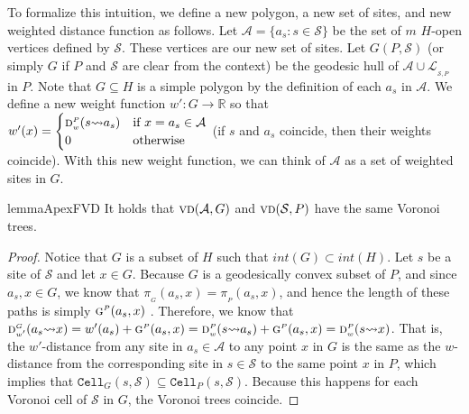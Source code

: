 \documentclass[a4paper, 11pt]{article}
\newcommand{\s}{\mathcal S}
\newcommand{\g}[3][P]{\ensuremath{\textsc{g}^{\scriptscriptstyle #1}(#2, #3)}}
\newcommand{\dd}[3][P]{\ensuremath{\textsc{d}_{\scriptscriptstyle w}^{\scriptscriptstyle #1}(#2 {\leadsto} #3)}}
\newcommand{\ddw}[3][P]{\ensuremath{\textsc{d}_{\scriptscriptstyle w'}^{\scriptscriptstyle #1}(#2 {\leadsto} #3)}}
\newcommand{\p}[3][P]{\ensuremath{\pi_{_{#1}}(#2, #3)}}
\newcommand{\cell}[2][P]{\ensuremath{\mathtt{Cell}_{\scriptscriptstyle #1}(#2)}}
\newcommand{\vd}[2][P]{\textsc{vd}(#2, #1)}
\newcommand{\LL}[1][\s, P]{\ensuremath{\mathcal L_{_{#1}}}}
\newcommand{\A}{\ensuremath{\mathcal A}}
\begin{document}
To formalize this intuition, we define a new polygon, a new set of sites, and new weighted distance function as follows.
Let $\A = \{a_s: s\in \s\}$ be the set of $m$ $H$-open vertices defined by $\s$. These vertices are our new set of sites.
Let $G(P, \s)$ (or simply $G$ if $P$ and $\s$ are clear from the context) be the geodesic hull of $\A\cup \LL$ in $P$.
Note that $G\subseteq H$ is a simple polygon by the definition of each $a_s$ in $\A$.
We define a new weight function $w':G\to \mathbb{R}$ so that $w'(x) = \begin{cases} \dd{s}{a_s}& \text{if }x=a_s\in \A \\ 0&\text{otherwise} \end{cases}$  (if $s$ and $a_s$ coincide, then their weights coincide).
With this new weight function, we can think of $\A$ as a set of weighted sites in $G$.

\begin{restatable}{lemma}{ApexFVD}\label{lemma:ApexFVD}
It holds that $\vd[G]{\A}$ and $\vd[P]{\s}$ have the same Voronoi trees.
\end{restatable}
\begin{proof}
Notice that $G$ is a subset of $H$ such that $int(G)\subset int(H)$.
Let $s$ be a site of $\s$ and let $x\in G$. 
Because $G$ is a geodesically convex subset of $P$, and since $a_s, x\in G$, we know that $\p[G]{a_s}{x} = \p{a_s}{x}$, and hence the length of these paths is simply $\g{a_s}{x}$ . 
Therefore, we know that  $\ddw[G]{a_s}{x} = w'(a_s) + \g{a_s}{x} = \dd{s}{a_s} + \g{a_s}{x} = \dd{s}{x}$.
That is, the $w'$-distance from any site in $a_s \in \A$ to any point $x$ in $G$ is the same as the $w$-distance from the corresponding site in $s\in \s$ to the same point $x$ in $P$, which implies that $\cell[G]{s, \s} \subseteq \cell{s, \s}$. 
Because this happens for each Voronoi cell of $\s$ in $G$, the Voronoi trees coincide. 
\end{proof}
\end{document}
